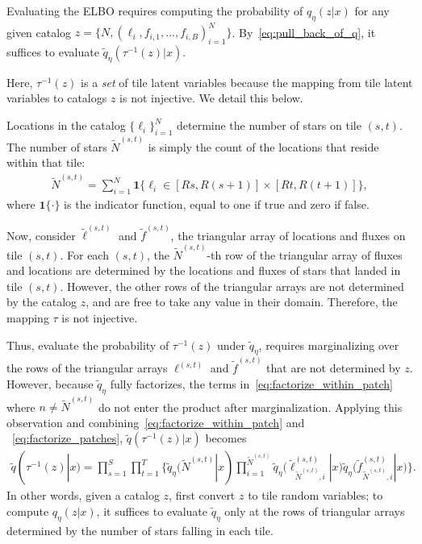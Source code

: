 \noindent Evaluating
the ELBO requires computing the probability of 
$q_\eta(z | x)$
for any given catalog $z = \{N, (\ell_i, f_{i,1}, ..., f_{i,B})_{i = 1}^N\}$. 
By~\eqref{eq:pull_back_of_q}, 
it suffices to evaluate $\tilde q_\eta(\tau^{-1}(z) | x)$. 

Here, $\tau^{-1}(z)$ is a {\itshape set} of tile latent variables because the mapping from tile latent variables to catalogs $z$ is not injective. We detail this below. 

Locations in the catalog $\{\ell_i\}_{i=1}^N$
determine the number of stars on tile $(s,t)$. 
The number of stars $\tilde N^{(s,t)}$ is simply the count of the locations that reside within that tile:
\begin{align}
\tilde N^{(s,t)} = \sum_{i=1}^N 
\mathbf 1 \Big\{\ell_i\in [Rs, R(s+1)] \times [Rt, R(t+1)]\Big\},
\end{align}
where $\mathbf{1}\{\cdot\}$ is the indicator function, equal to one if true and zero if false.

Now, consider $\tilde\ell^{(s, t)}$ and $\tilde f^{(s, t)}$, the triangular array of locations and fluxes on tile $(s,t)$. 
For each $(s,t)$, the $\tilde N^{(s,t)}$-th row 
of the triangular array of fluxes and locations are 
determined by the locations and fluxes of stars that landed in tile $(s,t)$. However, the other rows 
of the triangular arrays are not determined by 
the catalog $z$, and are free to take any value in their domain. Therefore, the mapping $\tau$ is not injective. 

Thus, evaluate the probability of $\tau^{-1}(z)$ under $\tilde q_\eta$, requires marginalizing over the rows of the triangular arrays $\ell^{(s, t)}$ and $\tilde f^{(s, t)}$ that are not determined by $z$. However, 
because $\tilde q_\eta$ fully factorizes, the terms 
in~\eqref{eq:factorize_within_patch} where $n \not= \tilde N^{(s,t)}$ do not enter the
product
after marginalization.
Applying this observation and combining~\eqref{eq:factorize_within_patch} and ~\eqref{eq:factorize_patches}, $\tilde q(\tau^{-1}(z) | x)$ becomes
\begin{align}
    \tilde q(\tau^{-1}(z) | x) = \prod_{s=1}^S\prod_{t=1}^T
    \Big\{
    \tilde q_\eta(\tilde N^{(s,t)} | x) 
    \prod_{i = 1}^{\tilde N^{(s,t)}}
    \tilde q_\eta\big(\tilde \ell_{\tilde N^{(s,t)},i}^{(s, t)} | x\big)
    \tilde q_\eta\big(\tilde f_{\tilde N^{(s,t)},i}^{(s, t)} | x\big)
    \Big\}.
\end{align}
In other words, given a catalog $z$,
first convert $z$ to tile random variables;
to compute $q_\eta(z | x)$, it suffices to evaluate $\tilde q_\eta$ only at the rows of triangular 
arrays determined by the number 
of stars falling in each tile. 


